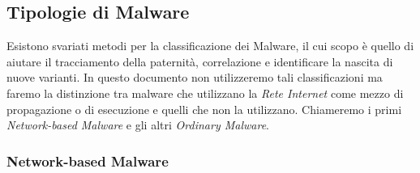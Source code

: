 \subsection{Tipologie di Malware}
Esistono svariati metodi per la classificazione dei Malware, il cui scopo è quello di aiutare il tracciamento della paternità, correlazione e identificare la nascita di nuove varianti. In questo documento non utilizzeremo tali classificazioni ma faremo la distinzione tra malware che utilizzano la \textit{Rete Internet} come mezzo di propagazione o di esecuzione e quelli che non la utilizzano. Chiameremo i primi \textit{Network-based Malware}\cite{malware} e gli altri \textit{Ordinary Malware}\cite{malware}.

\subsubsection{Network-based Malware}

